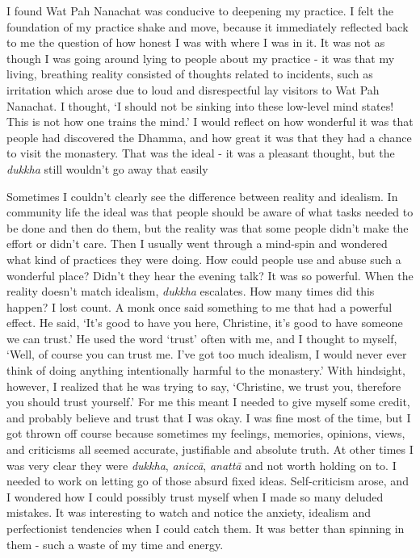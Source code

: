 I found Wat Pah Nanachat was conducive to deepening my practice. I felt
the foundation of my practice shake and move, because it immediately
reflected back to me the question of how honest I was with where I was
in it. It was not as though I was going around lying to people about my
practice - it was that my living, breathing reality consisted of
thoughts related to incidents, such as irritation which arose due to
loud and disrespectful lay visitors to Wat Pah Nanachat. I thought, `I
should not be sinking into these low-level mind states! This is not how
one trains the mind.' I would reflect on how wonderful it was that
people had discovered the Dhamma, and how great it was that they had a
chance to visit the monastery. That was the ideal - it was a pleasant
thought, but the \emph{dukkha} still wouldn't go away that easily

Sometimes I couldn't clearly see the difference between reality and
idealism. In community life the ideal was that people should be aware of
what tasks needed to be done and then do them, but the reality was that
some people didn't make the effort or didn't care. Then I usually went
through a mind-spin and wondered what kind of practices they were doing.
How could people use and abuse such a wonderful place? Didn't they hear
the evening talk? It was so powerful. When the reality doesn't match
idealism, \emph{dukkha} escalates. How many times did this happen? I
lost count. A monk once said something to me that had a powerful effect.
He said, `It's good to have you here, Christine, it's good to have
someone we can trust.' He used the word `trust' often with me, and I
thought to myself, `Well, of course you can trust me. I've got too much
idealism, I would never ever think of doing anything intentionally
harmful to the monastery.' With hindsight, however, I realized that he
was trying to say, `Christine, we trust you, therefore you should trust
yourself.' For me this meant I needed to give myself some credit, and
probably believe and trust that I was okay. I was fine most of the time,
but I got thrown off course because sometimes my feelings, memories,
opinions, views, and criticisms all seemed accurate, justifiable and
absolute truth. At other times I was very clear they were \emph{dukkha},
\emph{aniccā}, \emph{anattā} and not worth holding on to. I needed to
work on letting go of those absurd fixed ideas. Self-criticism arose,
and I wondered how I could possibly trust myself when I made so many
deluded mistakes. It was interesting to watch and notice the anxiety,
idealism and perfectionist tendencies when I could catch them. It was
better than spinning in them - such a waste of my time and energy.

